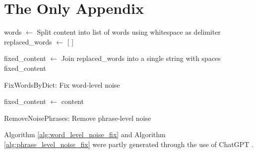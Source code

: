 \chapter{The Only Appendix}
\label{app:A}

\begin{algorithm}

    words $\gets$ Split content into list of words using whitespace as delimiter\;
    replaced\_words $\gets$ [ ]\;

    fixed\_content $\gets$ Join replaced\_words into a single string with spaces\;
    \Return fixed\_content\;
    \caption{FixWordsByDict: Fix word-level noise}
    \label{alg:word_level_noise_fix}
\end{algorithm}


\begin{algorithm}


    fixed\_content $\gets$ content\;


    \caption{RemoveNoisePhrases: Remove phrase-level noise}
    \label{alg:phrase_level_noise_fix}
\end{algorithm}

Algorithm \ref{alg:word_level_noise_fix} and Algorithm \ref{alg:phrase_level_noise_fix} were partly generated through the use of ChatGPT \cite{openai-2024-gpt4}.